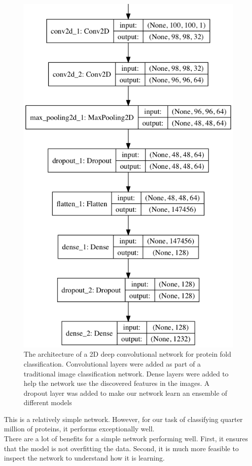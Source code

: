 \documentclass[12pt, a4paper, twocolumn, fullpage]{article}
\theoremstyle{plain}
\theoremstyle{definition}
\theoremstyle{remark}
\begin{document}
\begin{figure}
\includegraphics[width=\linewidth]{model_plot.png}
\caption{The architecture of a 2D deep convolutional network for protein fold classification. Convolutional layers were added as part of a traditional image classification network. Dense layers were added to help the network use the discovered features in the images. A dropout layer was added to make our network learn an ensemble of different models}
\label{model_plot}
\end{figure}

This is a relatively simple network. However, for our task of classifying quarter million of proteins, it performs exceptionally well. 
\\
There are a lot of benefits for a simple network performing well. First, it ensures that the model is not overfitting the data. Second, it is much more feasible to inspect the network to understand how it is learning.
\end{document}

